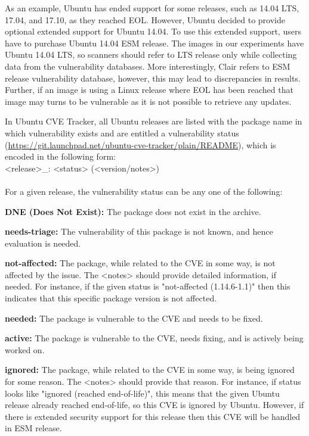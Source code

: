 \documentclass[a4paper,num-refs]{oup-contemporary}
\begin{document}
As an example, Ubuntu has ended support for some releases, such as 14.04 LTS,
17.04, and 17.10, as they reached EOL. However, Ubuntu decided to provide optional extended support for Ubuntu 14.04.
To use this extended support, users have to purchase Ubuntu 14.04 ESM release.
The images in our experiments have Ubuntu 14.04 LTS, so scanners should refer
to LTS release only while collecting data from the vulnerability databases.
More interestingly, Clair refers to ESM release vulnerability database, however, this may lead to discrepancies in results.
Further, if an image is using a Linux release where EOL has been reached that image may
turns to be vulnerable as it is not possible to retrieve any updates.

In Ubuntu CVE Tracker, all Ubuntu releases are listed with the package name
in which vulnerability exists and are entitled a vulnerability status
(\url{https://git.launchpad.net/ubuntu-cve-tracker/plain/README}), which is
encoded in the following form:
\newline \\
\noindent <release>\_<source-package>: <status> (<version/notes>) \\
\newline\\
For a given release, the vulnerability status can be any one of the following:

\textbf{DNE (Does Not Exist):} The package does not exist in the
		archive.

\textbf{needs-triage:} The vulnerability of this package
		is not known, and hence evaluation is needed.

\textbf{not-affected:} The package, while related to the
		CVE in some way, is not affected by the issue. The <notes> should
		provide detailed information, if needed. For instance, if the given
		status is "not-affected (1.14.6-1.1)" then this indicates that this specific
		package version is not affected.

\textbf{needed:} The package is vulnerable to the
		CVE and needs to be fixed.

\textbf{active:} The package is vulnerable to the
		CVE, needs fixing, and is actively being worked on.

\textbf{ignored:} The package, while related to the
		CVE in some way, is being ignored for some reason. The
		<notes> should provide that reason. For instance, if status looks like
		"ignored (reached end-of-life)", this means that the given Ubuntu release already reached
		end-of-life, so this CVE is ignored by Ubuntu. However, if there
		is extended security support for this release then this
		CVE will be handled in ESM release.
\end{document}

